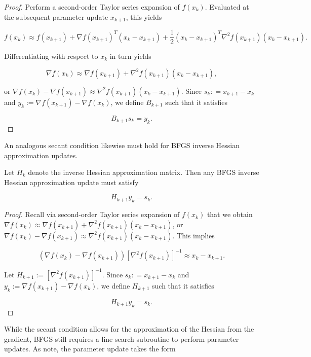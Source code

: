 \documentclass[twoside,11pt]{article}
\begin{document}
\begin{proof}
Perform a second-order Taylor series expansion of $f(x_k)$. Evaluated at the subsequent parameter update $x_{k+1}$, this yields

\[
f(x_k) \approx f(x_{k+1}) + \nabla f(x_{k+1})^T (x_k - x_{k+1}) + \frac{1}{2}(x_k - x_{k+1})^T \nabla^2f(x_{k+1})(x_k - x_{k+1}).
\]

\noindent
Differentiating with respect to $x_k$ in turn yields

\[
\nabla f(x_k) \approx \nabla f(x_{k+1}) + \nabla^2f(x_{k+1})(x_k - x_{k+1}), 
\]

\noindent
or $\nabla f(x_k) - \nabla f(x_{k+1}) \approx \nabla^2f(x_{k+1})(x_k - x_{k+1})$. Since $s_k : = x_{k+1}-x_k$ and $y_k := \nabla f(x_{k+1}) - \nabla f(x_{k})$, we define $B_{k+1}$ such that it satisfies

\[
B_{k+1}s_k = y_k.
\]
\end{proof}

\noindent
An analogous secant condition likewise must hold for BFGS inverse Hessian approximation updates.

\begin{corollary}
Let $H_k$ denote the inverse Hessian approximation matrix. Then any BFGS inverse Hessian approximation update must satisfy

\[
H_{k+1}y_k = s_k.
\]
\end{corollary}

\begin{proof}
Recall via second-order Taylor series expansion of $f(x_k)$ that we obtain $\nabla f(x_k) \approx \nabla f(x_{k+1}) + \nabla^2f(x_{k+1})(x_k - x_{k+1})$, or $\nabla f(x_k) - \nabla f(x_{k+1}) \approx \nabla^2f(x_{k+1})(x_k - x_{k+1})$. This implies

\[
(\nabla f(x_k) - \nabla f(x_{k+1}))[\nabla^2 f(x_{k+1})]^{-1} \approx x_k - x_{k+1}.
\]

\noindent
Let $H_{k+1} := [\nabla^2f(x_{k+1})]^{-1}$. Since $s_k : = x_{k+1}-x_k$ and $y_k := \nabla f(x_{k+1}) - \nabla f(x_{k})$, we define $H_{k+1}$ such that it satisfies

\[
H_{k+1}y_k = s_k.
\]
\end{proof}

\noindent
While the secant condition allows for the approximation of the Hessian from the gradient, BFGS still requires a line search subroutine to perform parameter updates. As \cite{NW06} note, the parameter update takes the form
\end{document}
